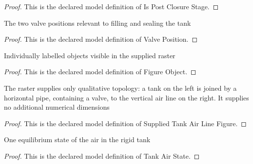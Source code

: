 \begin{proof}
  This is the declared model definition of Is Post Closure Stage.
\end{proof}
\begin{definition}
  \label{def:physics:phyx-mini-0401:phyxminiproblems-problemphyxmini0401-valveposition}
  The two valve positions relevant to filling and sealing the tank
\end{definition}
\begin{proof}
  This is the declared model definition of Valve Position.
\end{proof}
\begin{definition}
  \label{def:physics:phyx-mini-0401:phyxminiproblems-problemphyxmini0401-figureobject}
  Individually labelled objects visible in the supplied raster
\end{definition}
\begin{proof}
  This is the declared model definition of Figure Object.
\end{proof}
\begin{definition}
  \label{def:physics:phyx-mini-0401:phyxminiproblems-problemphyxmini0401-suppliedtankairlinefigure}
  The raster supplies only qualitative topology: a tank on the left is joined by a horizontal pipe, containing a valve, to the vertical air line on the right. It supplies no additional numerical dimensions
\end{definition}
\begin{proof}
  This is the declared model definition of Supplied Tank Air Line Figure.
\end{proof}
\begin{definition}
  \label{def:physics:phyx-mini-0401:phyxminiproblems-problemphyxmini0401-tankairstate}
  One equilibrium state of the air in the rigid tank
\end{definition}
\begin{proof}
  This is the declared model definition of Tank Air State.
\end{proof}
